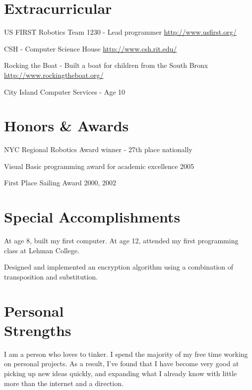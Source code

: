\documentclass[a4paper,margin,line]{resume}
\newcommand{\rurl}[1]{\hfill {\footnotesize \url{#1}}}
\begin{document}
\begin{resume}
\section{\mysidestyle Extracurricular}
	\begin{asparablank}
		\item US FIRST Robotics Team 1230 - {\small Lead programmer} \rurl{http://www.usfirst.org/}
		\item CSH - {\small Computer Science House} \rurl{http://www.csh.rit.edu/}
		\item Rocking the Boat - {\small Built a boat for children from the South
		Bronx} \rurl{http://www.rockingtheboat.org/}
		\item City Island Computer Services - {\small Age 10}
	\end{asparablank}

\section{\mysidestyle Honors \& Awards}
	\begin{asparablank}
		\item NYC Regional Robotics Award winner - {\small 27th place nationally}
		\item Visual Basic programming award for academic excellence 2005
		\item First Place Sailing Award 2000, 2002
	\end{asparablank}

\section{\mysidestyle Special Accomplishments}
	\begin{asparablank}
		\item At age 8, built my first computer. At age 12, attended my first
		programming class at Lehman College.
		\item Designed and implemented an encryption algorithm using a
		combination of transposition and substitution.
	\end{asparablank}

\section{\mysidestyle Personal \\ Strengths}
	I am a person who loves to tinker. I spend the majority of my free time
	working on personal projects. As a result, I've found that I have become very
	good at picking up new ideas quickly, and expanding what I already know with
	little more than the internet and a direction.

\end{resume}
\pagebreak[4] %

\end{document}
